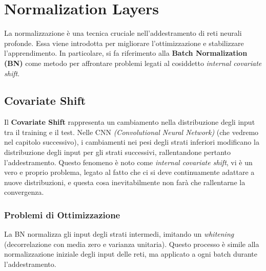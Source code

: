 \chapter{Normalization Layers}
La normalizzazione è una tecnica cruciale nell’addestramento di reti neurali profonde. Essa viene introdotta per migliorare l’ottimizzazione e stabilizzare l'apprendimento. In particolare, si fa riferimento alla \textbf{Batch Normalization (BN)} come metodo per affrontare problemi legati al cosiddetto \textit{internal covariate shift}.

\section{Covariate Shift}
Il \textbf{Covariate Shift} rappresenta un cambiamento nella distribuzione degli input tra il training e il test. Nelle CNN \textit{(Convolutional Neural Network)} (che vedremo nel capitolo successivo), i cambiamenti nei pesi degli strati inferiori modificano la distribuzione degli input per gli strati successivi, rallentandone pertanto l'addestramento. Questo fenomeno è noto come \textit{internal covariate shift}, vi è un vero e proprio problema, legato al fatto che ci si deve continuamente adattare a nuove distribuzioni, e questa cosa inevitabilmente non farà che rallentarne la convergenza.

\subsection{Problemi di Ottimizzazione}
La BN normalizza gli input degli strati intermedi, imitando un \textit{whitening} (decorrelazione con media zero e varianza unitaria). 
Questo processo è simile alla normalizzazione iniziale degli input delle reti, ma applicato a ogni batch durante l’addestramento.

